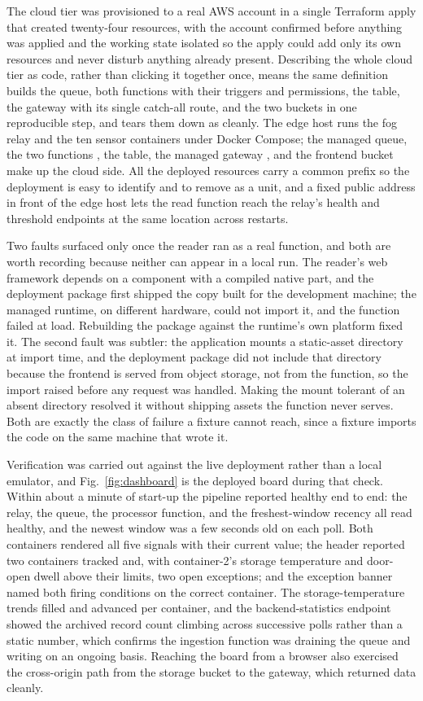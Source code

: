\documentclass[conference]{IEEEtran}
\begin{document}
The cloud tier was provisioned to a real AWS account in a single Terraform apply that created twenty-four resources, with the account confirmed before anything was applied and the working state isolated so the apply could add only its own resources and never disturb anything already present. Describing the whole cloud tier as code, rather than clicking it together once, means the same definition builds the queue, both functions with their triggers and permissions, the table, the gateway with its single catch-all route, and the two buckets in one reproducible step, and tears them down as cleanly. The edge host runs the fog relay and the ten sensor containers under Docker Compose; the managed queue, the two functions \cite{awslambda}, the table, the managed gateway \cite{awsapigw}, and the frontend bucket make up the cloud side. All the deployed resources carry a common prefix so the deployment is easy to identify and to remove as a unit, and a fixed public address in front of the edge host lets the read function reach the relay's health and threshold endpoints at the same location across restarts.

Two faults surfaced only once the reader ran as a real function, and both are worth recording because neither can appear in a local run. The reader's web framework depends on a component with a compiled native part, and the deployment package first shipped the copy built for the development machine; the managed runtime, on different hardware, could not import it, and the function failed at load. Rebuilding the package against the runtime's own platform fixed it. The second fault was subtler: the application mounts a static-asset directory at import time, and the deployment package did not include that directory because the frontend is served from object storage, not from the function, so the import raised before any request was handled. Making the mount tolerant of an absent directory resolved it without shipping assets the function never serves. Both are exactly the class of failure a fixture cannot reach, since a fixture imports the code on the same machine that wrote it.

Verification was carried out against the live deployment rather than a local emulator, and Fig.~\ref{fig:dashboard} is the deployed board during that check. Within about a minute of start-up the pipeline reported healthy end to end: the relay, the queue, the processor function, and the freshest-window recency all read healthy, and the newest window was a few seconds old on each poll. Both containers rendered all five signals with their current value; the header reported two containers tracked and, with container-2's storage temperature and door-open dwell above their limits, two open exceptions; and the exception banner named both firing conditions on the correct container. The storage-temperature trends filled and advanced per container, and the backend-statistics endpoint showed the archived record count climbing across successive polls rather than a static number, which confirms the ingestion function was draining the queue and writing on an ongoing basis. Reaching the board from a browser also exercised the cross-origin path from the storage bucket to the gateway, which returned data cleanly.
\end{document}
